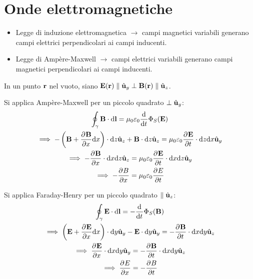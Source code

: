 \chapter{Onde elettromagnetiche}

\begin{itemize}
    \item Legge di induzione elettromagnetica $\to$ campi magnetici variabili generano campi elettrici perpendicolari ai campi inducenti.
    \item Legge di Ampère-Maxwell $\to$ campi elettrici variabili generano campi magnetici perpendicolari ai campi inducenti.
\end{itemize}

In un punto $\mathbf{r}$ nel vuoto, siano $\mathbf{E}(\mathbf{r}) \parallel \hat{\mathbf{u}}_{y} \perp \mathbf{B}(\mathbf{r}) \parallel \hat{\mathbf{u}}_{z}$.


Si applica Ampère-Maxwell per un piccolo quadrato $\perp \hat{\mathbf{u}}_{y}$:
\begin{equation}
\label{eq:ampere_maxwell_quadratino}
\begin{gathered}
    \oint_\gamma \B \lde
    = \mu_0\eps_0 \der{t} \Phi_S(\E) \\
    \implies
    -\pts{\B + \parder[\B]{x} \de x} \cdot \de z \uz + \B \cdot \de z \uz
    = \mu_0 \eps_0 \parder[\E]{t} \cdot \de z \de x \uy \\
    \implies
    - \parder[\B]{x} \cdot \de x \de z \uz
    = \mu_0 \eps_0 \parder[\E]{t} \cdot \de x \de z \uy \\
    \implies
    - \parder[B]{x} = \mu_0 \eps_0 \parder[E]{t}
\end{gathered}
\end{equation}


Si applica Faraday-Henry per un piccolo quadrato $\parallel \hat{\mathbf{u}}_{z}$:
\begin{equation}
\label{eq:faraday_henry_quadratino}
\begin{gathered}
    \oint_\gamma \E \lde
    = -\der{t} \Phi_S(\B) \\
    \implies
    \pts{\E + \parder[\E]{x} \de x} \cdot \de y \uy - \E \cdot \de y \uy
    = - \parder[\B]{t} \cdot \de x \de y \uz \\
    \implies
    \parder[\E]{x} \cdot \de x \de y \uy
    = - \parder[\B]{t} \cdot \de x \de y \uz \\
    \implies
    \parder[E]{x} = - \parder[B]{t}
\end{gathered}
\end{equation}


